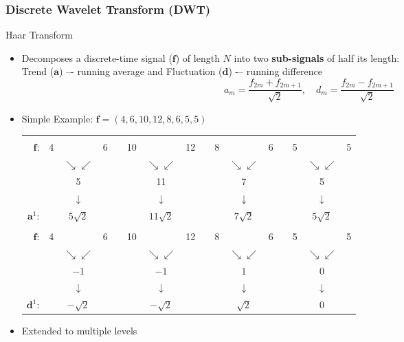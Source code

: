 \documentclass[9pt]{beamer}
\begin{document}
\begin{frame}
\frametitle{Discrete Wavelet Transform (DWT)}

\begin{block}{Haar Transform}
    \begin{itemize}
    \item Decomposes a discrete-time signal ($\mathbf{f}$) of length $N$ into two \textbf{sub-signals} of half its length: \\Trend ($\mathbf{a}$) –- running average and Fluctuation ($\mathbf{d}$) -– running difference
    \begin{displaymath}
    a_{m} = \frac{f_{2m}+f_{2m+1}}{\sqrt{2}},\quad d_{m} = \frac{f_{2m} - f_{2m+1}}{\sqrt{2}}
    \end{displaymath}
    
    \pause
    
    \item Simple Example: $\mathbf{f} = (4,6,10,12,8,6,5,5)$
{\scriptsize
\begin{tabular}{rccccccccccccccc}
  &   &  & & & &  & & & &  & & & &  &   \\ 
$\mathbf{f}$: & 4 & & 6 & & 10 & & 12 & & 8 & & 6 & & 5 & & 5 \\ 
\pause
 &   & $\searrow$$\swarrow$ & & & & $\searrow$$\swarrow$ & & & & $\searrow$$\swarrow$ & & & & $\searrow$$\swarrow$ &  \\ 
  &   & 5 & & & & 11 & & & & 7 & & & & 5 &   \\ 
\pause
 &   & $\downarrow$ & & & & $\downarrow$ & & & & $\downarrow$ & & & & $\downarrow$ &  \\
$\mathbf{a}^{1}$: & & $5\sqrt{2}$ & & & & $11\sqrt{2}$ & & & & $7\sqrt{2}$ & & & & $5\sqrt{2}$ & \\  
\pause
 &  & &  & &  & &  & &  & &  & &  & &  \\ 
$\mathbf{f}$: & 4 & & 6 & & 10 & & 12 & & 8 & & 6 & & 5 & & 5 \\ 
\pause
 &   & $\searrow$$\swarrow$ & & & & $\searrow$$\swarrow$ & & & & $\searrow$$\swarrow$ & & & & $\searrow$$\swarrow$ &  \\
 &   & $-1$ & & & & $-1$ & & & & $1$ & & & & $0$ &   \\ 
\pause
 &   & $\downarrow$ & & & & $\downarrow$ & & & & $\downarrow$ & & & & $\downarrow$ &  \\
$\mathbf{d}^{1}$: & & $-\sqrt{2}$ & & & & $-\sqrt{2}$ & & & & $\sqrt{2}$ & & & & $0$ &   
\end{tabular}
}
\pause
	\item Extended to multiple levels
	\end{itemize}
\end{block}
\end{frame}
\end{document}
